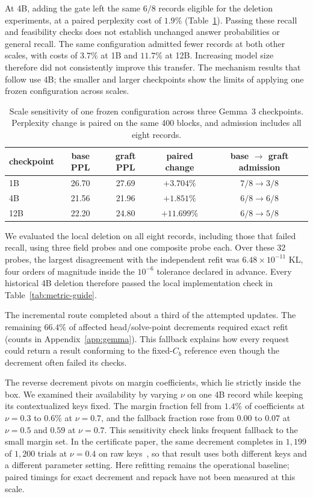 At 4B, adding the gate left the same \(6/8\) records eligible for the
deletion experiments, at a paired perplexity cost of \(1.9\%\)
(Table~\ref{tab:scale}). Passing these recall and feasibility checks does
not establish unchanged answer probabilities or general recall. The same
configuration admitted fewer records at both other scales, with costs of
\(3.7\%\) at 1B and \(11.7\%\) at 12B. Increasing model size therefore
did not consistently improve this transfer. The mechanism results that
follow use 4B; the smaller and larger checkpoints show the limits of applying
one frozen configuration across scales.

\begin{table}[h]
\centering
\caption{Scale sensitivity of one frozen configuration across three Gemma~3
checkpoints. Perplexity change is paired on the same 400 blocks, and admission
includes all eight records.}
\label{tab:scale}
\small
\begin{tabular}{@{}lcccc@{}}
\toprule
checkpoint & base PPL & graft PPL & paired change & base \(\to\) graft admission \\
\midrule
1B & 26.70 & 27.69 & \(+3.704\%\) & \(7/8\to3/8\) \\
4B & 21.56 & 21.96 & \(+1.851\%\) & \(6/8\to6/8\) \\
12B & 22.20 & 24.80 & \(+11.699\%\) & \(6/8\to5/8\) \\
\bottomrule
\end{tabular}
\end{table}

We evaluated the local deletion on all eight records, including those that
failed recall, using three field probes and one composite probe each. Over
these 32 probes, the largest disagreement with the independent refit was
\(6.48\times10^{-11}\) KL, four orders of magnitude inside the
\(10^{-6}\) tolerance declared in advance. Every historical 4B deletion
therefore passed the local implementation check in
Table~\ref{tab:metric-guide}.

The incremental route completed about a third of the attempted updates.
The remaining \(66.4\%\) of affected head/solve-point decrements required
exact refit (counts in Appendix~\ref{app:gemma}). This fallback explains
how every request could return a result conforming to the fixed-\(C_b\)
reference even though the decrement often failed its checks.

The reverse decrement pivots on margin coefficients, which lie strictly
inside the box. We examined their availability by varying \(\nu\) on one
4B record while keeping its contextualized keys fixed. The margin fraction
fell from \(1.4\%\) of coefficients at \(\nu=0.3\) to \(0.6\%\) at
\(\nu=0.7\), and the fallback fraction rose from \(0.00\) to \(0.07\) at
\(\nu=0.5\) and \(0.59\) at \(\nu=0.7\). This sensitivity check links
frequent fallback to the small margin set. In the certificate paper, the
same decrement completes in \(1{,}199\) of \(1{,}200\) trials at
\(\nu=0.4\) on raw keys~\citep{svattn}, so that result uses both different
keys and a different parameter setting. Here refitting remains the
operational baseline; paired timings for exact decrement and repack have
not been measured at this scale.

